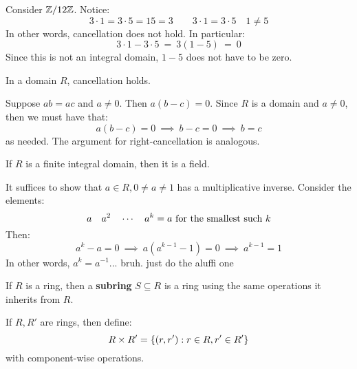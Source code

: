 Consider $ \mathbb{Z}/12\mathbb{Z} $. Notice:
\begin{equation*}
    3\cdot 1 = 3\cdot 5 = 15 = 3 \qquad 3\cdot 1 = 3\cdot 5 \quad 1 \neq 5
\end{equation*}
In other words, cancellation does not hold. In particular:
\begin{equation*}
    3\cdot 1 - 3\cdot 5 \ = \ 3(1 - 5) \ = \ 0
\end{equation*}
Since this is not an integral domain, $ 1 - 5 $ does not have to be zero.

\begin{lm}
    In a domain $ R $, cancellation holds.
\end{lm}

\begin{pf}[source=Primary Source Material]
    Suppose $ ab = ac $ and $ a \neq 0 $. \vsp
    Then $ a(b - c) = 0 $. Since $ R $ is a domain and $ a \neq 0 $, then we must
    have that:
    \begin{equation*}
        a(b - c) = 0 \ \implies \ b - c = 0 \ \implies \ b = c
    \end{equation*}
    as needed. The argument for right-cancellation is analogous.
\end{pf}

\begin{thm}
    If $ R $ is a finite integral domain, then it is a field.
\end{thm}

\begin{pf}[source=Primary Source Material]
    It suffices to show that $ a \in R, 0 \neq a \neq 1 $ has a multiplicative inverse.
    Consider the elements:
    \begin{equation*}
        a \quad a^{2} \quad \cdots \quad a^{k} = a \textrm{ for the smallest such $ k $}
    \end{equation*}
    Then:
    \begin{equation*}
        a^{k} - a = 0 \ \implies \ a(a^{k-1} - 1) = 0 \ \implies \ a^{k-1} = 1
    \end{equation*}
    In other words, $ a^{k} = a^{-1} $... bruh. just do the aluffi one
\end{pf}

\begin{defn}
    If $ R $ is a ring, then a \textbf{subring} $ S \subseteq R $ is a ring using the same
    operations it inherits from $ R $.
\end{defn}

\begin{defn}
    If $ R, R' $ are rings, then define:
    \begin{equation*}
        R \times R' = \left\{{(r, r') : r \in R, r' \in R'}\right\}
    \end{equation*}
    with component-wise operations.
\end{defn}

